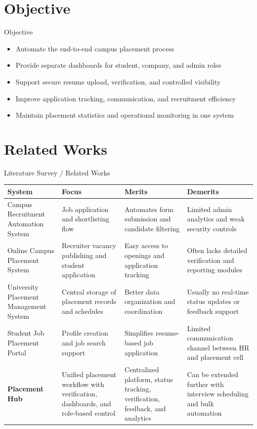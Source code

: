 \documentclass{beamer}
\begin{document}
\section{Objective}
\begin{frame}{Objective}
\begin{itemize}
\item Automate the end-to-end campus placement process
\item Provide separate dashboards for student, company, and admin roles
\item Support secure resume upload, verification, and controlled visibility
\item Improve application tracking, communication, and recruitment efficiency
\item Maintain placement statistics and operational monitoring in one system
\end{itemize}
\end{frame}

\section{Related Works}
\begin{frame}{Literature Survey / Related Works}
\scriptsize
\renewcommand{\arraystretch}{1.15}
\begin{center}
\begin{tabular}{|p{2.5cm}|p{2.9cm}|p{2.6cm}|p{2.7cm}|}
\hline
\textbf{System} & \textbf{Focus} & \textbf{Merits} & \textbf{Demerits} \\ \hline
Campus Recruitment Automation System & Job application and shortlisting flow & Automates form submission and candidate filtering & Limited admin analytics and weak security controls \\ \hline
Online Campus Placement System & Recruiter vacancy publishing and student application & Easy access to openings and application tracking & Often lacks detailed verification and reporting modules \\ \hline
University Placement Management System & Central storage of placement records and schedules & Better data organization and coordination & Usually no real-time status updates or feedback support \\ \hline
Student Job Placement Portal & Profile creation and job search support & Simplifies resume-based job application & Limited communication channel between HR and placement cell \\ \hline
\textbf{Placement Hub} & Unified placement workflow with verification, dashboards, and role-based control & Centralized platform, status tracking, verification, feedback, and analytics & Can be extended further with interview scheduling and bulk automation \\ \hline
\end{tabular}
\end{center}
\end{frame}
\end{document}
